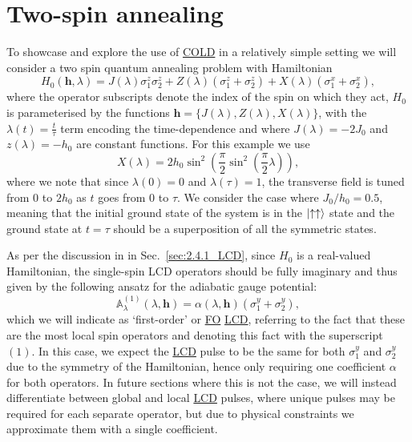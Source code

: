 \documentclass[a4paper,oneside,11pt]{book}
\newcommand{\hbb}{\boldsymbol{h}}
\newcommand{\sx}{\sigma^x}
\newcommand{\sy}{\sigma^y}
\newcommand{\sz}{\sigma^z}
\newcommand{\approxAGP}{\mathbb{A}_{\lambda}}
\newcommand{\acrref}[1]{\hyperref[acr:#1]{#1}}
\begin{document}
\section{Two-spin annealing}\label{sec:5.1_2spin_annealing}

To showcase and explore the use of \acrref{COLD} in a relatively simple setting we will consider a two spin quantum annealing problem with Hamiltonian
\begin{equation}\label{eq:two_spin_hamiltonian}
H_0(\hbb, \lambda) = J(\lambda) \sz_1 \sz_2 + Z(\lambda) ( \sz_{1} + \sz_{2}) +  X(\lambda) (\sx_{1} + \sx_{2}),
\end{equation}
where the operator subscripts denote the index of the spin on which they act, $H_0$ is parameterised by the functions $\hbb = \{J(\lambda), Z(\lambda), X(\lambda)\}$, with the $\lambda(t) = \frac{t}{\tau}$ term encoding the time-dependence and where $J(\lambda) = -2J_0$ and $z(\lambda) = -h_0$ are constant functions. For this example we use
\begin{equation}\label{eq:lambda_func1}
X(\lambda) = 2 h_0 \sin^2\left(\frac{\pi}{2} \sin^2 \left( \frac{\pi}{2} \lambda \right) \right),
\end{equation}
where we note that since $\lambda(0) = 0$ and $\lambda(\tau) = 1$, the transverse field is tuned from $0$ to $2h_0$ as $t$ goes from $0$ to $\tau$. We consider the case where $J_0/h_0 = 0.5$, meaning that the initial ground state of the system is in the $\ket{\uparrow \uparrow}$ state and the ground state at $t = \tau$ should be a superposition of all the symmetric states.

As per the discussion in in Sec.~\ref{sec:2.4.1_LCD}, since $H_0$ is a real-valued Hamiltonian, the single-spin LCD operators should be fully imaginary and thus given by the following ansatz for the adiabatic gauge potential:
\begin{equation}\label{eq:LCD1st}
\approxAGP^{(1)}(\lambda, \hbb) = \alpha(\lambda, \hbb) (\sy_1 + \sy_2),
\end{equation}
which we will indicate as `first-order' or \acrref{FO} \acrref{LCD}, referring to the fact that these are the most local spin operators and denoting this fact with the superscript $(1)$. In this case, we expect the \acrref{LCD} pulse to be the same for both $\sy_1$ and $\sy_2$ due to the symmetry of the Hamiltonian, hence only requiring one coefficient $\alpha$ for both operators. In future sections where this is not the case, we will instead differentiate between global and local \acrref{LCD} pulses, where unique pulses may be required for each separate operator, but due to physical constraints we approximate them with a single coefficient.
\end{document}
